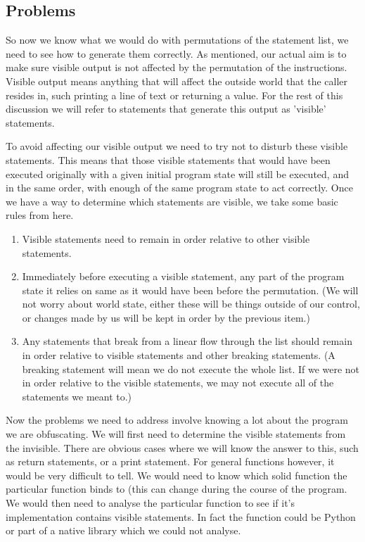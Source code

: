\documentclass{report}
\begin{document}
\subsection{Problems}

So now we know what we would do with permutations of the statement list, we need to see how to generate them correctly. As mentioned, our actual
aim is to make sure visible output is not affected by the permutation of the instructions. Visible output means anything that will affect the outside
world that the caller resides in, such printing a line of text or returning a value. For the rest of this discussion we will refer to statements that generate
this output as 'visible' statements.

To avoid affecting our visible output we need to try not to disturb these visible statements. This means that those visible statements that would have been
executed originally with a given initial program state will still be executed, and in the same order, with enough of the same program state to act correctly.
Once we have a way to determine which statements are visible, we take some basic rules from here.

\begin{enumerate}
\item Visible statements need to remain in order relative to other visible statements.
\item Immediately before executing a visible statement, any part of the program state it relies on same as it would have been before the permutation.
(We will not worry about world state, either these will be things outside of our control, or changes made by us will be kept in order by the previous
item.)
\item Any statements that break from a linear flow through the list should remain in order relative to visible statements and other breaking statements.
(A breaking statement will mean we do not execute the whole list. If we were not in order relative to the visible statements, we may not execute all of
the statements we meant to.)
\end{enumerate}

Now the problems we need to address involve knowing a lot about the program we are obfuscating. We will first need to determine the visible statements
from the invisible. There are obvious cases where we will know the answer to this, such as return statements, or a print statement. For general functions
however, it would be very difficult to tell. We would need to know which solid function the particular function binds to (this can change during the course
of the program. We would then need to analyse the particular function to see if it's implementation contains visible statements. In fact the function could be
Python or part of a native library which we could not analyse.
\end{document}
